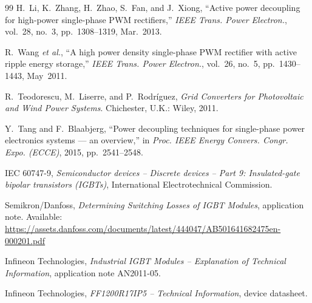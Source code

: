 \begin{thebibliography}{99}
 H.~Li, K.~Zhang, H.~Zhao, S.~Fan, and J.~Xiong, ``Active power decoupling for high-power single-phase PWM rectifiers,'' \emph{IEEE Trans. Power Electron.}, vol.~28, no.~3, pp.~1308--1319, Mar.~2013.

 R.~Wang \emph{et al.}, ``A high power density single-phase PWM rectifier with active ripple energy storage,'' \emph{IEEE Trans. Power Electron.}, vol.~26, no.~5, pp.~1430--1443, May~2011.

 R.~Teodorescu, M.~Liserre, and P.~Rodr\'{i}guez, \emph{Grid Converters for Photovoltaic and Wind Power Systems}. Chichester, U.K.: Wiley, 2011.

 Y.~Tang and F.~Blaabjerg, ``Power decoupling techniques for single-phase power electronics systems --- an overview,'' in \emph{Proc. IEEE Energy Convers. Congr. Expo. (ECCE)}, 2015, pp.~2541--2548.

 IEC 60747-9, \emph{Semiconductor devices -- Discrete devices -- Part 9: Insulated-gate bipolar transistors (IGBTs)}, International Electrotechnical Commission.

 Semikron/Danfoss, \emph{Determining Switching Losses of IGBT Modules}, application note. Available: \url{https://assets.danfoss.com/documents/latest/444047/AB501641682475en-000201.pdf}

 Infineon Technologies, \emph{Industrial IGBT Modules -- Explanation of Technical Information}, application note AN2011-05.

 Infineon Technologies, \emph{FF1200R17IP5 -- Technical Information}, device datasheet.

\end{thebibliography}
